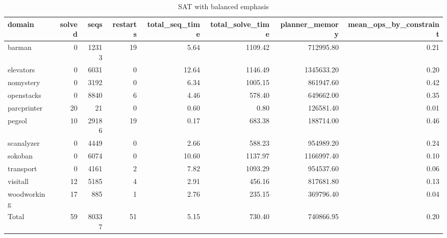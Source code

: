 \begin{table*}[htbp]
\centering
\begingroup\small
\begin{tabular}{lrrrrrrr}
  \hline
domain & solved & seqs & restarts & total\_seq\_time & total\_solve\_time & planner\_memory & mean\_ops\_by\_constraint \\ 
  \hline
barman &   0 & 12313 &  19 & 5.64 & 1109.42 & 712995.80 & 0.21 \\ 
  elevators &   0 & 6031 &   0 & 12.64 & 1146.49 & 1345633.20 & 0.20 \\ 
  nomystery &   0 & 3192 &   0 & 6.34 & 1005.15 & 861947.60 & 0.42 \\ 
  openstacks &   0 & 8840 &   6 & 4.46 & 578.40 & 649662.00 & 0.35 \\ 
  parcprinter &  20 &  21 &   0 & 0.60 & 0.80 & 126581.40 & 0.01 \\ 
  pegsol &  10 & 29186 &  19 & 0.17 & 683.38 & 188714.00 & 0.46 \\ 
  scanalyzer &   0 & 4449 &   0 & 2.66 & 588.23 & 954989.20 & 0.24 \\ 
  sokoban &   0 & 6074 &   0 & 10.60 & 1137.97 & 1166997.40 & 0.10 \\ 
  transport &   0 & 4161 &   2 & 7.82 & 1093.29 & 954537.60 & 0.06 \\ 
  visitall &  12 & 5185 &   4 & 2.91 & 456.16 & 817681.80 & 0.13 \\ 
  woodworking &  17 & 885 &   1 & 2.76 & 235.15 & 369796.40 & 0.04 \\ 
  Total &  59 & 80337 &  51 & 5.15 & 730.40 & 740866.95 & 0.20 \\ 
   \hline
\end{tabular}
\endgroup
\caption{SAT with balanced emphasis} 
\label{tab:default_sat}
\end{table*}
